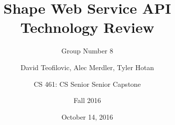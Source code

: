 \documentclass[letterpaper,draftclsnofoot,10pt,onecolumn,titlepage]{IEEEtran}\usepackage[margin=0.75in]{geometry}
\title{Shape Web Service API Technology Review}
\author{
	Group Number 8\\
	\and
	David Teofilovic, Alec Merdler, Tyler Hotan\\
	\and
	CS 461: CS Senior Senior Capstone\\
	\and
	Fall 2016\\
}
\date{October 14, 2016}
\begin{document}
\begin{titlepage}
\clearpage\maketitle
\thispagestyle{empty}

\maketitle
\end{titlepage}
\end{document}
